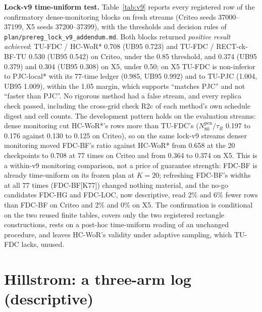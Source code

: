 \documentclass[sigconf,anonymous,review]{acmart}
\newcommand{\Npen}{N_{80}^{\text{pen}}}
\begin{document}
\textbf{Lock-v9 time-uniform test.} Table~\ref{tab:v9} reports every registered row of the confirmatory dense-monitoring blocks on fresh streams (Criteo seeds 37000--37199, X5 seeds 37200--37399), with the thresholds and decision rules of \texttt{plan/prereg\_lock\_v9\_addendum.md}. Both blocks returned \emph{positive result achieved}: TU-FDC / HC-WoR* 0.708 (UB95 0.723) and TU-FDC / RECT-ck-BF-TU 0.530 (UB95 0.542) on Criteo, under the 0.85 threshold, and 0.374 (UB95 0.379) and 0.304 (UB95 0.308) on X5, under 0.50; on X5 TU-FDC is non-inferior to PJC-local* with its 77-time ledger (0.985, UB95 0.992) and to TU-PJC (1.004, UB95 1.009), within the 1.05 margin, which supports ``matches PJC'' and not ``faster than PJC''. No rigorous method had a false stream, and every replica check passed, including the cross-grid check R2c of each method's own schedule digest and cell counts. The development pattern holds on the evaluation streams: dense monitoring cut HC-WoR*'s rows more than TU-FDC's ($\Npen/\tau_R$ 0.197 to 0.176 against 0.130 to 0.125 on Criteo), so on the same lock-v9 streams denser monitoring moved FDC-BF's ratio against HC-WoR* from 0.658 at the 20 checkpoints to 0.708 at 77 times on Criteo and from 0.364 to 0.374 on X5. This is a within-v9 monitoring comparison, not a price of guarantee strength: FDC-BF is already time-uniform on its frozen plan at $K = 20$; refreshing FDC-BF's widths at all 77 times (FDC-BF[K77]) changed nothing material, and the no-go candidates FDC-HG and FDC-LOC, now descriptive, read 2\% and 6\% fewer rows than FDC-BF on Criteo and 2\% and 0\% on X5. The confirmation is conditional on the two reused finite tables, covers only the two registered rectangle constructions, rests on a post-hoc time-uniform reading of an unchanged procedure, and leaves HC-WoR's validity under adaptive sampling, which TU-FDC lacks, unused.





\section{Hillstrom: a three-arm log (descriptive)}\label{app:hillstrom}
\end{document}
